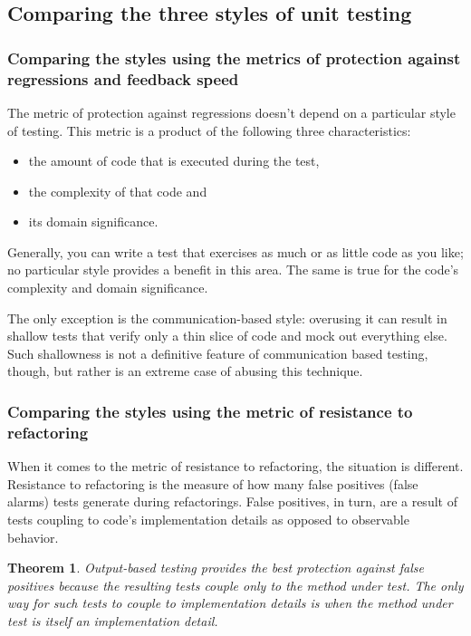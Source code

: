 \documentclass{article}
\newtheorem{theorem}{Theorem}
\begin{document}
\subsection{Comparing the three styles of unit testing}
\subsubsection{Comparing the styles using the metrics of protection against regressions and feedback speed}

The metric of protection against regressions doesn’t depend on a particular style of testing. This metric is a product of the following three characteristics:
\begin{itemize}
	\item the amount of code that is executed during the test,
	\item the complexity of that code and
	\item	 its domain significance.
\end{itemize}
Generally, you can write a test that exercises as much or as little code as you like; no particular style provides a benefit in this area. The same is true for the code’s complexity and domain significance.

The only exception is the communication-based style: overusing it can result in shallow tests that verify only a thin slice of code and mock out everything else. Such shallowness is not a definitive feature of communication based testing, though, but rather is an extreme case of abusing this technique.

\subsubsection{Comparing the styles using the metric of resistance to refactoring}

When it comes to the metric of resistance to refactoring, the situation is different. Resistance to refactoring is the measure of how many false positives (false alarms) tests generate during refactorings. False positives, in turn, are a result of tests coupling to code’s implementation details as opposed to observable behavior.

\begin{theorem}
\textit{Output-based testing} provides the best protection against false positives because the resulting tests couple only to the method under test. The only way for such tests to couple to implementation details is when the method under test is itself an implementation detail.
\end{theorem}
\end{document}
